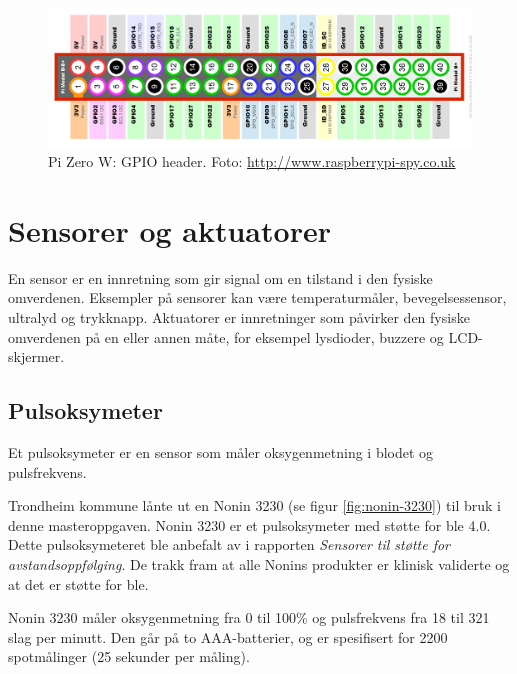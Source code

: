 \begin{figure}
\includegraphics[width=1.0\textwidth,center]{fig/pizero_gpio}
\caption{Pi Zero W: GPIO header. Foto: \url{http://www.raspberrypi-spy.co.uk}}
\label{fig:pizero_gpio}
\end{figure}

\section{Sensorer og aktuatorer}
En sensor er en innretning som gir signal om en tilstand i den fysiske omverdenen. Eksempler
på sensorer kan være temperaturmåler, bevegelsessensor, ultralyd og trykknapp. Aktuatorer er innretninger som påvirker
den fysiske omverdenen på en eller annen måte, for eksempel lysdioder, buzzere og LCD-skjermer.

\subsection{Pulsoksymeter}
Et pulsoksymeter er en sensor som måler oksygenmetning i blodet og pulsfrekvens.

Trondheim kommune lånte ut en Nonin 3230 (se figur \ref{fig:nonin-3230}) til bruk i denne masteroppgaven.
Nonin 3230 er et pulsoksymeter med støtte for \gls{ble} 4.0. Dette pulsoksymeteret ble anbefalt av \citet{austad2016sensorer}
i rapporten \textit{Sensorer til støtte for avstandsoppfølging}. De trakk fram at alle Nonins produkter
er klinisk validerte og at det er støtte for \gls{ble}. %

Nonin 3230 måler oksygenmetning fra 0 til 100\% og pulsfrekvens fra 18 til 321 slag per minutt. Den går på to
AAA-batterier, og er spesifisert for 2200 spotmålinger (25 sekunder per måling).

